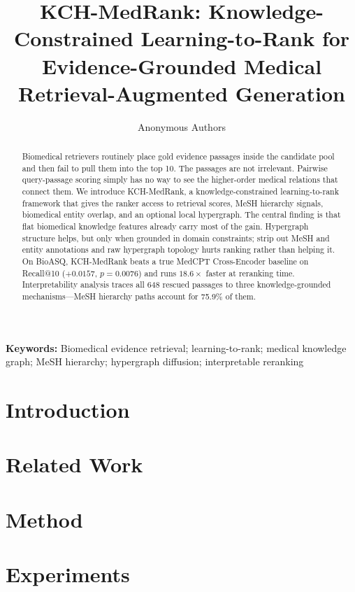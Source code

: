 \documentclass[11pt]{article}
\title{KCH-MedRank: Knowledge-Constrained Learning-to-Rank for Evidence-Grounded Medical Retrieval-Augmented Generation}
\author{Anonymous Authors}
\date{}
\begin{document}
\maketitle

\begin{abstract}
Biomedical retrievers routinely place gold evidence passages inside the candidate pool and then fail to pull them into the top 10. The passages are not irrelevant. Pairwise query-passage scoring simply has no way to see the higher-order medical relations that connect them. We introduce KCH-MedRank, a knowledge-constrained learning-to-rank framework that gives the ranker access to retrieval scores, MeSH hierarchy signals, biomedical entity overlap, and an optional local hypergraph. The central finding is that flat biomedical knowledge features already carry most of the gain. Hypergraph structure helps, but only when grounded in domain constraints; strip out MeSH and entity annotations and raw hypergraph topology hurts ranking rather than helping it. On BioASQ, KCH-MedRank beats a true MedCPT Cross-Encoder baseline on Recall@10 ($+0.0157$, $p=0.0076$) and runs $18.6\times$ faster at reranking time. Interpretability analysis traces all 648 rescued passages to three knowledge-grounded mechanisms---MeSH hierarchy paths account for 75.9\% of them.
\end{abstract}

\vspace{5pt}
\noindent\textbf{Keywords:} Biomedical evidence retrieval; learning-to-rank; medical knowledge graph; MeSH hierarchy; hypergraph diffusion; interpretable reranking

\section{Introduction}

\section{Related Work}

\section{Method}
\label{sec:method}


\section{Experiments}




\end{document}
